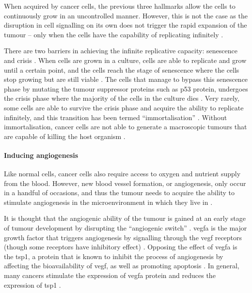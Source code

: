 \noindent
When acquired by cancer cells, the previous three hallmarks allow the cells to continuously grow in an uncontrolled manner.
However, this is not the case as the disruption in cell signalling on its own does not trigger the rapid expansion of the tumour -- only when the cells have the capability of replicating infinitely \citep{Hanahan2000, Hanahan2011}.

There are two barriers in achieving the infinite replicative capacity: senescence and crisis \citep{Hanahan2011}.
When cells are grown in a culture, cells are able to replicate and grow until a certain point, and the cells reach the stage of senescence where the cells stop growing but are still viable \citep{Hanahan2011}.
The cells that manage to bypass this senescence phase by mutating the tumour suppressor proteins such as p53 protein, undergoes the crisis phase where the majority of the cells in the culture dies \citep{Hanahan2011}.
Very rarely, some cells are able to survive the crisis phase and acquire the ability to replicate infinitely, and this transition has been termed ``immortalisation'' \citep{Hanahan2011, Wright1989}.
Without immortalisation, cancer cells are not able to generate a macroscopic tumours that are capable of killing the host organism \citep{Hanahan2000,Hanahan2011}.

\paragraph{Inducing angiogenesis}

\noindent
Like normal cells, cancer cells also require access to oxygen and nutrient supply from the blood.
However, new blood vessel formation, or angiogenesis, only occur in a handful of occasions, and thus the tumour needs to acquire the ability to stimulate angiogenesis in the microenvironment in which they live in \citep{Hanahan2011}.

It is thought that the angiogenic ability of the tumour is gained at an early stage of tumour development by disrupting the ``angiogenic switch'' \citep{Hanahan2011}.
\Gls{vegfa} is the major growth factor that triggers angiogenesis by signalling through the \acrshort{vegf} receptors (though some receptors have inhibitory effect) \citep{Yancopoulos2000}.
Opposing the effect of \Gls{vegfa} is the \gls{tsp1}, a protein that is known to inhibit the process of angiogenesis by affecting the bioavailability of \acrshort{vegf}, as well as promoting apoptosis \citep{Kazerounian2008}.
In general, many cancers stimulate the expression of \gls{vegfa} protein and reduces the expression of \gls{tsp1} \citep{Kazerounian2008}.

